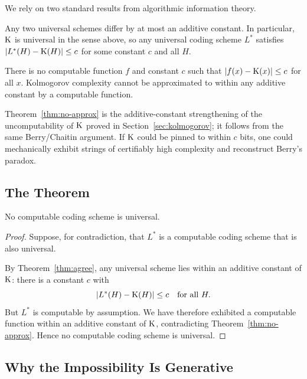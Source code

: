 We rely on two standard results from algorithmic information theory.

\begin{theorem}
\label{thm:agree}
Any two universal schemes differ by at most an additive constant. In particular, $\mathrm{K}$ is universal in the sense above, so any universal coding scheme $L^{*}$ satisfies $|L^{*}(H) - \mathrm{K}(H)| \leq c$ for some constant $c$ and all $H$.
\end{theorem}

\begin{theorem}
\label{thm:no-approx}
There is no computable function $f$ and constant $c$ such that $|f(x) - \mathrm{K}(x)| \leq c$ for all $x$. Kolmogorov complexity cannot be approximated to within any additive constant by a computable function.
\end{theorem}

Theorem~\ref{thm:no-approx} is the additive-constant strengthening of the uncomputability of $\mathrm{K}$ proved in Section~\ref{sec:kolmogorov}; it follows from the same Berry/Chaitin argument. If $\mathrm{K}$ could be pinned to within $c$ bits, one could mechanically exhibit strings of certifiably high complexity and reconstruct Berry's paradox.

\subsection{The Theorem}

\begin{theorem}
\label{thm:no-universal}
No computable coding scheme is universal.
\end{theorem}

\begin{proof}
Suppose, for contradiction, that $L^{*}$ is a computable coding scheme that is also universal.

By Theorem~\ref{thm:agree}, any universal scheme lies within an additive constant of $\mathrm{K}$: there is a constant $c$ with
\[
  |L^{*}(H) - \mathrm{K}(H)| \leq c \quad \text{for all } H.
\]
But $L^{*}$ is computable by assumption. We have therefore exhibited a computable function within an additive constant of $\mathrm{K}$, contradicting Theorem~\ref{thm:no-approx}. Hence no computable coding scheme is universal.
\end{proof}

\subsection{Why the Impossibility Is Generative}

